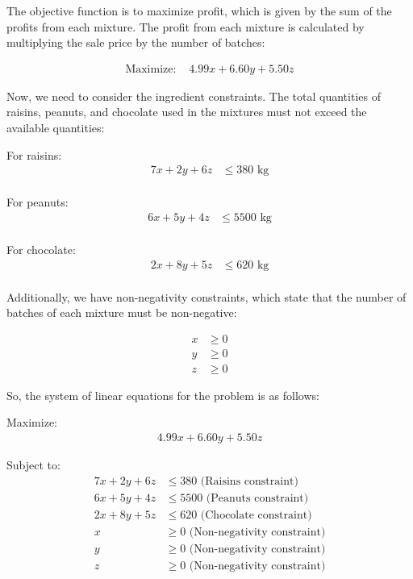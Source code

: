 \documentclass{article}
\begin{document}
The objective function is to maximize profit, which is given by the sum of the profits from each mixture. The profit from each mixture is calculated by multiplying the sale price by the number of batches:

\begin{align*}
\text{Maximize: } & 4.99x + 6.60y + 5.50z
\end{align*}

Now, we need to consider the ingredient constraints. The total quantities of raisins, peanuts, and chocolate used in the mixtures must not exceed the available quantities:

For raisins:
\begin{align*}
7x + 2y + 6z & \leq 380 \text{ kg} \\
\end{align*}

For peanuts:
\begin{align*}
6x + 5y + 4z & \leq 5500 \text{ kg} \\
\end{align*}

For chocolate:
\begin{align*}
2x + 8y + 5z & \leq 620 \text{ kg} \\
\end{align*}

Additionally, we have non-negativity constraints, which state that the number of batches of each mixture must be non-negative:

\begin{align*}
x & \geq 0 \\
y & \geq 0 \\
z & \geq 0
\end{align*}

So, the system of linear equations for the problem is as follows:

Maximize:
\begin{align*}
4.99x + 6.60y + 5.50z
\end{align*}

Subject to:
\begin{align*}
7x + 2y + 6z & \leq 380 \text{ (Raisins constraint)} \\
6x + 5y + 4z & \leq 5500 \text{ (Peanuts constraint)} \\
2x + 8y + 5z & \leq 620 \text{ (Chocolate constraint)} \\
x & \geq 0 \text{ (Non-negativity constraint)} \\
y & \geq 0 \text{ (Non-negativity constraint)} \\
z & \geq 0 \text{ (Non-negativity constraint)}
\end{align*}
\end{document}
